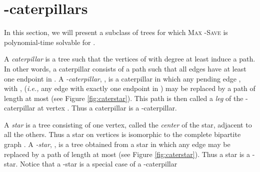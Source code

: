 \documentclass[10pt]{article}
\newcommand{\probtitle}[1]{\textsc{#1}}
\begin{document}
\section{-caterpillars}\label{s:caterpillars}
 
In this section, we will present a subclass of trees for which \probtitle{Max -Save} is polynomial-time solvable for .

A \textit{caterpillar} is a tree  such that the vertices of  with degree at least  induce a path. In other words, a caterpillar  consists of a path  such that all edges have at least one endpoint in . A \textit{-caterpillar}, , is a caterpillar in which any pending edge , with ,  (\textit{i.e.,} any edge with exactly one endpoint in ) may be replaced by a path of length at most  (see Figure \ref{fig:caterstar}). This path is then called a \textit{leg} of the -caterpillar at vertex . Thus a caterpillar is a -caterpillar.

A \textit{star} is a tree consisting of one vertex, called the \textit{center} of the star, adjacent to all the others. Thus a star on  vertices is isomorphic to the complete bipartite graph . A \textit{-star}, , is a tree obtained from a star in which any edge may be replaced by a path of length at most  (see Figure \ref{fig:caterstar}). Thus a star is a -star.
Notice that a -star is a special case of a -caterpillar
\end{document}
